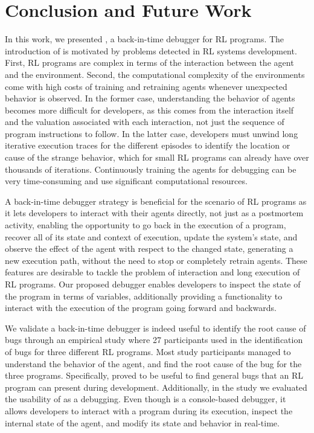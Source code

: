 
\section{Conclusion and Future Work}
\label{sec:conclusion}

In this work, we presented \flik, a back-in-time debugger for \ac{RL} programs. The introduction of \flik 
is motivated by problems detected in \ac{RL} systems development. First, \ac{RL} programs are 
complex in terms of the interaction between the agent and the environment. Second, the computational 
complexity of the environments come with high costs of training and retraining agents whenever 
unexpected behavior is observed. 
In the former case, understanding the behavior of agents becomes more difficult for developers, as this 
comes from the interaction itself and the valuation associated with each interaction, not just the 
sequence of program instructions to follow. In the latter case, developers must unwind long iterative 
execution traces for the different episodes to identify the location or cause of the strange behavior, 
which for small \ac{RL} programs can already have over thousands of iterations. Continuously training 
the agents for debugging can be very time-consuming and use significant computational resources.

A back-in-time debugger strategy is beneficial for the scenario of \ac{RL} programs as it lets 
developers to interact with their agents directly, not just as a postmortem activity, enabling the 
opportunity to go back in the execution of a program, recover all of its state and context of execution, 
update the system's state, and observe the effect of the agent with respect to the changed state, 
generating a new execution path, without the need to stop or completely retrain agents. These features 
are desirable to tackle the problem of interaction and long execution of \ac{RL} programs. Our proposed 
debugger enables developers to inspect the state of the program in terms of variables, additionally 
providing a functionality to interact with the execution of the program going forward and backwards.

We validate a back-in-time debugger is indeed useful to identify the root cause of bugs through an 
empirical study where 27 participants used \flik in the identification of bugs for three different \ac{RL} 
programs. Most study participants managed to understand the behavior of the agent, and find the root 
cause of the bug for the three programs. Specifically, \flik proved  to be useful to find general bugs that 
an \ac{RL} program can present during development. 
Additionally, in the study we evaluated the usability of \flik as a debugging. Even though \flik is a 
console-based debugger, it allows developers to interact with a program during its execution, inspect 
the internal state of the agent, and modify its state and behavior in real-time. 

